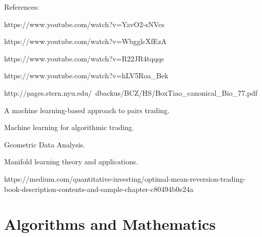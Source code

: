 \documentclass[11pt]{article}
\begin{document}
References:

https://www.youtube.com/watch?v=YavO2-sNVcs

https://www.youtube.com/watch?v=WbgglcXfEzA

https://www.youtube.com/watch?v=R22JR4tqqqs

https://www.youtube.com/watch?v=hLV5Roa_Bek

http://pages.stern.nyu.edu/~dbackus/BCZ/HS/BoxTiao_canonical_Bio_77.pdf

A machine learning-based approach to pairs trading.

Machine learning for algorithmic trading.

Geometric Data Analysis.

Manifold learning theory and applications.

https://medium.com/quantitative-investing/optimal-mean-reversion-trading-book-description-contents-and-sample-chapter-c80494b0e24a

\section{Algorithms and Mathematics}
\end{document}
